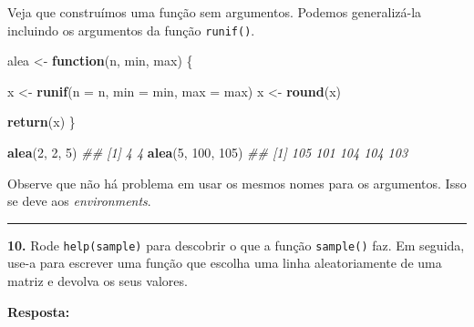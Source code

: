 \documentclass[
]{book}
\newenvironment{Shaded}{\begin{snugshade}}{\end{snugshade}}
\newcommand{\CommentTok}[1]{\textcolor[rgb]{0.56,0.35,0.01}{\textit{#1}}}
\newcommand{\ControlFlowTok}[1]{\textcolor[rgb]{0.13,0.29,0.53}{\textbf{#1}}}
\newcommand{\DataTypeTok}[1]{\textcolor[rgb]{0.13,0.29,0.53}{#1}}
\newcommand{\DecValTok}[1]{\textcolor[rgb]{0.00,0.00,0.81}{#1}}
\newcommand{\KeywordTok}[1]{\textcolor[rgb]{0.13,0.29,0.53}{\textbf{#1}}}
\newcommand{\NormalTok}[1]{#1}
\newcommand{\StringTok}[1]{\textcolor[rgb]{0.31,0.60,0.02}{#1}}
\begin{document}
Veja que construímos uma função sem argumentos. Podemos generalizá-la incluindo os argumentos da função \texttt{runif()}.

\begin{Shaded}
\begin{Highlighting}[]
\NormalTok{alea <-}\StringTok{ }\ControlFlowTok{function}\NormalTok{(n, min, max) \{}
  
\NormalTok{  x <-}\StringTok{ }\KeywordTok{runif}\NormalTok{(}\DataTypeTok{n =}\NormalTok{ n, }\DataTypeTok{min =}\NormalTok{ min, }\DataTypeTok{max =}\NormalTok{ max)}
\NormalTok{  x <-}\StringTok{ }\KeywordTok{round}\NormalTok{(x)}
  
  \KeywordTok{return}\NormalTok{(x)}
\NormalTok{\}}

\KeywordTok{alea}\NormalTok{(}\DecValTok{2}\NormalTok{, }\DecValTok{2}\NormalTok{, }\DecValTok{5}\NormalTok{)}
\CommentTok{## [1] 4 4}
\KeywordTok{alea}\NormalTok{(}\DecValTok{5}\NormalTok{, }\DecValTok{100}\NormalTok{, }\DecValTok{105}\NormalTok{)}
\CommentTok{## [1] 105 101 104 104 103}
\end{Highlighting}
\end{Shaded}

Observe que não há problema em usar os mesmos nomes para os argumentos. Isso se deve aos \emph{environments}.

\begin{center}\rule{0.5\linewidth}{0.5pt}\end{center}

\textbf{10.} Rode \texttt{help(sample)} para descobrir o que a função \texttt{sample()} faz. Em seguida, use-a para escrever uma função que escolha uma linha aleatoriamente de uma matriz e devolva os seus valores.

\textbf{Resposta:}
\end{document}
